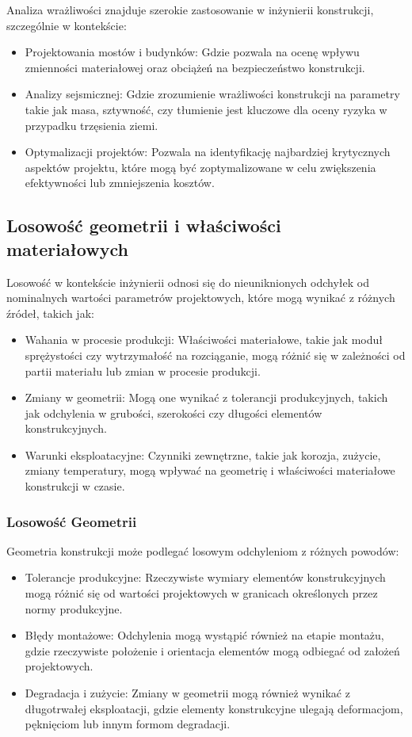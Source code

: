 Analiza wrażliwości znajduje szerokie zastosowanie w inżynierii konstrukcji, szczególnie w kontekście:

\begin{itemize}
    \item Projektowania mostów i budynków: Gdzie pozwala na ocenę wpływu zmienności materiałowej oraz obciążeń na bezpieczeństwo konstrukcji.
    \item Analizy sejsmicznej: Gdzie zrozumienie wrażliwości konstrukcji na parametry takie jak masa, sztywność, czy tłumienie jest kluczowe dla oceny ryzyka w przypadku trzęsienia ziemi.
    \item Optymalizacji projektów: Pozwala na identyfikację najbardziej krytycznych aspektów projektu, które mogą być zoptymalizowane w celu zwiększenia efektywności lub zmniejszenia kosztów.
\end{itemize}

\subsection{Losowość geometrii i właściwości materiałowych}

Losowość w kontekście inżynierii odnosi się do nieuniknionych odchyłek od nominalnych wartości parametrów projektowych, które mogą wynikać z różnych źródeł, takich jak:

\begin{itemize}
    \item Wahania w procesie produkcji: Właściwości materiałowe, takie jak moduł sprężystości czy wytrzymałość na rozciąganie, mogą różnić się w zależności od partii materiału lub zmian w procesie produkcji.
    \item Zmiany w geometrii: Mogą one wynikać z tolerancji produkcyjnych, takich jak odchylenia w grubości, szerokości czy długości elementów konstrukcyjnych.
    \item Warunki eksploatacyjne: Czynniki zewnętrzne, takie jak korozja, zużycie, zmiany temperatury, mogą wpływać na geometrię i właściwości materiałowe konstrukcji w czasie.
\end{itemize}

\subsubsection*{Losowość Geometrii}

Geometria konstrukcji może podlegać losowym odchyleniom z różnych powodów:

\begin{itemize}
    \item Tolerancje produkcyjne: Rzeczywiste wymiary elementów konstrukcyjnych mogą różnić się od wartości projektowych w granicach określonych przez normy produkcyjne.
    \item Błędy montażowe: Odchylenia mogą wystąpić również na etapie montażu, gdzie rzeczywiste położenie i orientacja elementów mogą odbiegać od założeń projektowych.
    \item Degradacja i zużycie: Zmiany w geometrii mogą również wynikać z długotrwałej eksploatacji, gdzie elementy konstrukcyjne ulegają deformacjom, pęknięciom lub innym formom degradacji.
\end{itemize}

